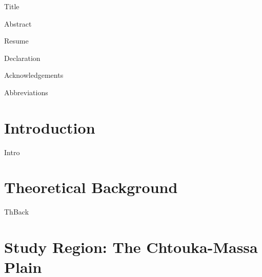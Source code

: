 \documentclass[a4paper, 12pt, bibliography=totoc, parskip=half, numbers=noenddot, twoside=true, open=right,headings=twolinechapter]{scrreprt}
\begin{document}
{Title}

\newpage
\thispagestyle{empty}
\mbox{}



\newpage
{Abstract}

\newpage
\thispagestyle{empty}
\mbox{}

\newpage
{Resume}

\newpage
{Declaration}

\newpage
\thispagestyle{empty}
\mbox{}

\newpage
{Acknowledgements}


\newpage
\thispagestyle{empty}
\mbox{}

\newpage
{}
\tableofcontents
\newpage

\listoffigures
{}
\listoftables

\newpage
{}
{Abbreviations}




\chapter{Introduction}
\label{Chap-Intro}

{Intro}

\chapter{Theoretical Background}
\label{Chap-TheoBack}

{ThBack}

\chapter{Study Region: The Chtouka-Massa Plain}
\label{Chap-SouMas}
\end{document}
